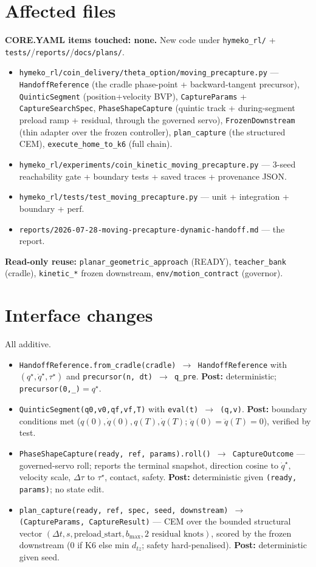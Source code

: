 \documentclass[11pt]{article}
\newcommand{\code}[1]{\texttt{\small #1}}
\begin{document}
\section{Affected files}
\textbf{CORE.YAML items touched: none.} New code under \code{hymeko\_rl/} + \code{tests/}/\code{reports/}/\code{docs/plans/}.
\begin{itemize}[nosep,leftmargin=1.4em]
  \item \code{hymeko\_rl/coin\_delivery/theta\_option/moving\_precapture.py} --- \code{HandoffReference} (the cradle
  phase-point + backward-tangent precursor), \code{QuinticSegment} (position+velocity BVP), \code{CaptureParams} +
  \code{CaptureSearchSpec}, \code{PhaseShapeCapture} (quintic track + during-segment preload ramp + residual, through
  the governed servo), \code{FrozenDownstream} (thin adapter over the frozen controller), \code{plan\_capture} (the
  structured CEM), \code{execute\_home\_to\_k6} (full chain).
  \item \code{hymeko\_rl/experiments/coin\_kinetic\_moving\_precapture.py} --- 3-seed reachability gate + boundary tests
  + saved traces + provenance JSON.
  \item \code{hymeko\_rl/tests/test\_moving\_precapture.py} --- unit + integration + boundary + perf.
  \item \code{reports/2026-07-28-moving-precapture-dynamic-handoff.md} --- the report.
\end{itemize}
\textbf{Read-only reuse:} \code{planar\_geometric\_approach} (READY), \code{teacher\_bank} (cradle), \code{kinetic\_*}
frozen downstream, \code{env/motion\_contract} (governor).

\section{Interface changes}
All additive.
\begin{itemize}[nosep,leftmargin=1.4em]
  \item \code{HandoffReference.from\_cradle(cradle) $\to$ HandoffReference} with $(q^\star,\dot q^\star,\tau^\star)$ and
  \code{precursor(n, dt) $\to$ q\_pre}. \textbf{Post:} deterministic; \code{precursor(0,\_)}$=q^\star$.
  \item \code{QuinticSegment(q0,v0,qf,vf,T)} with \code{eval(t) $\to$ (q,v)}. \textbf{Post:} boundary conditions met
  ($q(0),\dot q(0),q(T),\dot q(T)$; $\ddot q(0){=}\ddot q(T){=}0$), verified by test.
  \item \code{PhaseShapeCapture(ready, ref, params).roll() $\to$ CaptureOutcome} --- governed-servo roll; reports the
  terminal snapshot, direction cosine to $\dot q^\star$, velocity scale, $\Delta\tau$ to $\tau^\star$, contact, safety.
  \textbf{Post:} deterministic given \code{(ready, params)}; no state edit.
  \item \code{plan\_capture(ready, ref, spec, seed, downstream) $\to$ (CaptureParams, CaptureResult)} --- CEM over the
  bounded structural vector $(\Delta t, s, \text{preload\_start}, b_{\max}, \text{2 residual knots})$, scored by the
  frozen downstream ($0$ if K6 else min $d_{tz}$; safety hard-penalised). \textbf{Post:} deterministic given seed.
\end{itemize}
\end{document}
